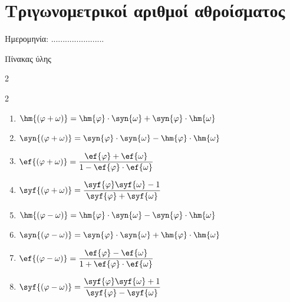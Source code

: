 \documentclass[twoside,nofonts,internet,math,spyros]{frontisthrio}
\newcommand{\myitem}{\stepcounter{enumi}\item[\raisebox{0.5mm}{\faEdit}\ \Large$\square$]}
\begin{document}
\newpage
\section{Τριγωνομετρικοί αριθμοί αθροίσματος}
\begin{flushright}
\faCalendar* Ημερομηνία: .......................
\end{flushright}
\begin{mybox}[mysubtitle]{Πίνακας ύλης}
\begin{multicols}{2}
\begin{todolist}[itemsep=0mm]
\myitem 
\end{todolist}
\end{multicols}
\begin{multicols}{2}
\begin{enumerate}[itemsep=0mm]
\item $ \hm{\left( \varphi+\omega\right) }=\hm{\varphi}\cdot\syn{\omega}+\syn{\varphi}\cdot\hm{\omega} $
\item $ \syn {\left( \varphi+\omega\right) }=\syn{\varphi}\cdot\syn{\omega}-\hm{\varphi}\cdot\hm{\omega} $
\item $ \ef{\left( \varphi+\omega\right) }=\dfrac{\ef{\varphi}+\ef{\omega}}{1-\ef{\varphi}\cdot\ef{\omega}} $
\item $ \syf{\left( \varphi+\omega\right) }=\dfrac{\syf{\varphi}\syf{\omega}-1}{\syf{\varphi}+\syf{\omega}} $
\item $ \hm{\left( \varphi-\omega\right) }=\hm{\varphi}\cdot\syn{\omega}-\syn{\varphi}\cdot\hm{\omega} $
\item $ \syn{\left( \varphi-\omega\right) }=\syn{\varphi}\cdot\syn{\omega}+\hm{\varphi}\cdot\hm{\omega} $
\item $ \ef{\left( \varphi-\omega\right) }=\dfrac{\ef{\varphi}-\ef{\omega}}{1+\ef{\varphi}\cdot\ef{\omega}} $
\item $ \syf{\left( \varphi-\omega\right) }=\dfrac{\syf{\varphi}\syf{\omega}+1}{\syf{\varphi}-\syf{\omega}} $
\end{enumerate}
\end{multicols}
\end{mybox}

\newpage
\end{document}
